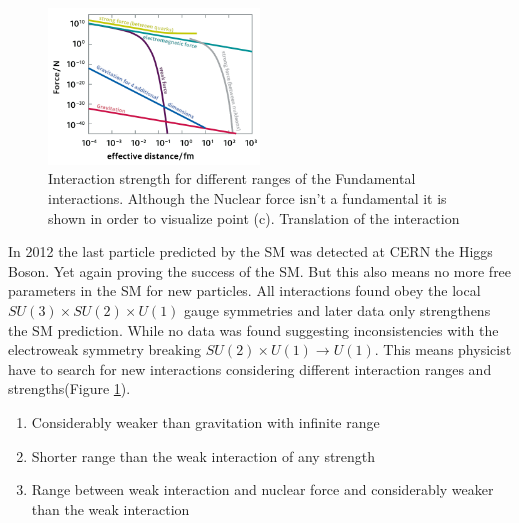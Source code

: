 \documentclass[../Bachelorarbeit.tex]{subfiles}
\begin{document}
\label{sec:BSM}
\begin{figure}
    \centering
    \includegraphics[width=0.5\textwidth]{images/Teilchenwet_WW_range.png}
    \caption{Interaction strength for different ranges of the Fundamental interactions. Although the Nuclear force isn't a fundamental it is shown in order to visualize point (c). Translation of the interaction }
    \label{fig:WW_range}
\end{figure}

In 2012 the last particle predicted by the SM was detected at CERN the Higgs Boson. Yet again proving the success of the SM.
But this also means no more free parameters in the SM for new particles. All interactions found obey the local $SU(3) \times SU(2) \times U(1)$ gauge symmetries
and later data only strengthens the SM prediction. While no data was found suggesting inconsistencies with the electroweak symmetry breaking $SU(2) \times U(1) \rightarrow U(1)$.
This means physicist have to search for new interactions considering different interaction ranges and strengths(Figure \ref{fig:WW_range}).
\begin{enumerate}[label=(\alph*)]
    \item Considerably weaker than gravitation with infinite range
    \item Shorter range than the weak interaction of any strength
    \item Range between weak interaction and nuclear force and considerably weaker than the weak interaction 
\end{enumerate}
\end{document}
